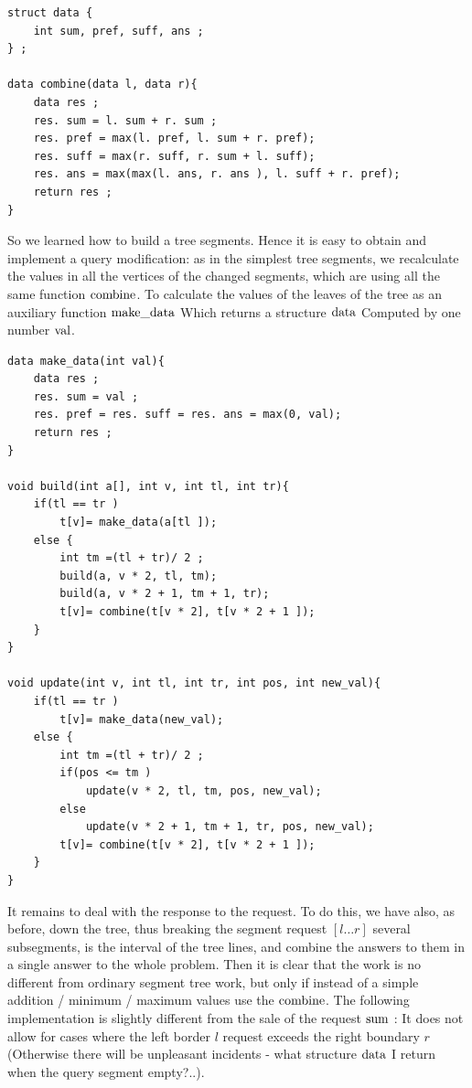 \begin{verbatim}
struct data {
    int sum, pref, suff, ans ;
} ;
 
data combine(data l, data r){
    data res ;
    res. sum = l. sum + r. sum ;
    res. pref = max(l. pref, l. sum + r. pref);
    res. suff = max(r. suff, r. sum + l. suff);
    res. ans = max(max(l. ans, r. ans ), l. suff + r. pref);
    return res ;
} 
\end{verbatim}
So we learned how to build a tree segments. Hence it is easy to obtain and implement a query modification: as in the simplest tree segments, we recalculate the values ​​in all the vertices of the changed segments, which are using all the same function $\rm combine$. To calculate the values ​​of the leaves of the tree as an auxiliary function $\rm make \_data$ Which returns a structure $\rm data$ Computed by one number $\rm val$.

\begin{verbatim}
data make_data(int val){
    data res ;
    res. sum = val ;
    res. pref = res. suff = res. ans = max(0, val);
    return res ;
}
 
void build(int a[], int v, int tl, int tr){
    if(tl == tr )
        t[v]= make_data(a[tl ]);
    else {
        int tm =(tl + tr)/ 2 ;
        build(a, v * 2, tl, tm);
        build(a, v * 2 + 1, tm + 1, tr);
        t[v]= combine(t[v * 2], t[v * 2 + 1 ]);
    }
}
 
void update(int v, int tl, int tr, int pos, int new_val){
    if(tl == tr )
        t[v]= make_data(new_val);
    else {
        int tm =(tl + tr)/ 2 ;
        if(pos <= tm )
            update(v * 2, tl, tm, pos, new_val);
        else
            update(v * 2 + 1, tm + 1, tr, pos, new_val);
        t[v]= combine(t[v * 2], t[v * 2 + 1 ]);
    }
} 
\end{verbatim}
It remains to deal with the response to the request. To do this, we have also, as before, down the tree, thus breaking the segment request $[l \ldots r]$ several subsegments, is the interval of the tree lines, and combine the answers to them in a single answer to the whole problem. Then it is clear that the work is no different from ordinary segment tree work, but only if instead of a simple addition / minimum / maximum values ​​use the $\rm combine$. The following implementation is slightly different from the sale of the request $\rm sum$ : It does not allow for cases where the left border $l$ request exceeds the right boundary $r$ (Otherwise there will be unpleasant incidents - what structure $\rm data$ I return when the query segment empty?..).

